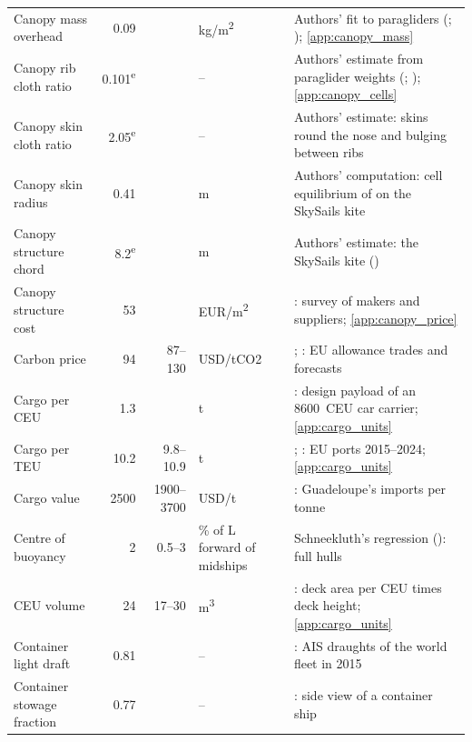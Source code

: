 \begin{longtable}{@{}>{\raggedright\arraybackslash}p{3.4cm}rr>{\raggedright\arraybackslash}p{1.4cm}>{\raggedright\arraybackslash}p{5.8cm}@{}}
Canopy mass overhead & \num{0.09} &  & kg/m\textsuperscript{2} & Authors' fit to paragliders (\citealp{ozone_ultralite3}; \citealp{nova_mentor6}); \cref{app:canopy_mass} \\
Canopy rib cloth ratio & \num{0.101}\textsuperscript{e} &  & -- & Authors' estimate from paraglider weights (\citealp{advance_alpha8}; \citealp{nova_mentor2}); \cref{app:canopy_cells} \\
Canopy skin cloth ratio & \num{2.05}\textsuperscript{e} &  & -- & Authors' estimate: skins round the nose and bulging between ribs \\
Canopy skin radius & \num{0.41} &  & m & Authors' computation: cell equilibrium of \citet{wang2018} on the SkySails kite \\
Canopy structure chord & \num{8.2}\textsuperscript{e} &  & m & Authors' estimate: the SkySails kite (\citealp[Table 1]{folkersma2020}) \\
Canopy structure cost & \num{53} &  & EUR/m\textsuperscript{2} & \citet[pp. 2 and 7]{joshi2024refeconomic}: survey of makers and suppliers; \cref{app:canopy_price} \\
Carbon price & \num{94} & \num{87}--\num{130} & USD/tCO2 & \citet{gmkcenter2026eua}; \citet{steelorbis2026eua}: EU allowance trades and forecasts \\
Cargo per CEU & \num{1.3} &  & t & \citet{keh_8600ceu_df_pctc}: design payload of an \num{8600}~CEU car carrier; \cref{app:cargo_units} \\
Cargo per TEU & \num{10.2} & \num{9.8}--\num{10.9} & t & \citet{eurostat_mar_mg_am_cwhc}; \citet{eurostat_mar_mg_am_cvh}: EU ports 2015--2024; \cref{app:cargo_units} \\
Cargo value & \num{2500} & \num{1900}--\num{3700} & USD/t & \citet{iedom2025guadeloupe}: Guadeloupe's imports per tonne \\
Centre of buoyancy & \num{2} & \num{0.5}--\num{3} & \% of L forward of midships & Schneekluth's regression (\citealp{ventura_estimation}): full hulls \\
CEU volume & \num{24} & \num{17}--\num{30} & m\textsuperscript{3} & \citet{keh_8600ceu_df_pctc}: deck area per CEU times deck height; \cref{app:cargo_units} \\
Container light draft & \num{0.81} &  & -- & \citet[Appendix J]{olmer2017}: AIS draughts of the world fleet in 2015 \\
Container stowage fraction & \num{0.77} &  & -- & \citet{blendermann1993}: side view of a container ship \\

\end{longtable}
